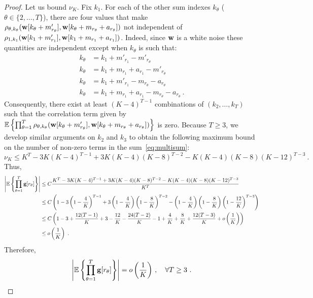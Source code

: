 \documentclass[journal,onecolumn]{IEEEtran}
\begin{document}
\begin{proof}
Let us bound $\nu_K$. Fix $k_1$. For each of the other sum indexes $k_\theta$ ($\theta\in\{2,\ldots,T\}$), there are four values that make $\rho_{\theta,k_\theta}({\mathbf w}[k_\theta+m'_{r_\theta}],{\mathbf w}[k_\theta+m_{r_\theta}+a_{r_\theta}])$ not independent of $\rho_{1,k_1}({\mathbf w}[k_1+m'_{r_1}],{\mathbf w}[k_1+m_{r_1}+a_{r_1}])$. Indeed, since ${\mathbf w}$ is a white noise these quantities are independent except when $k_\theta$ is such that:
\begin{align*}
k_\theta &= k_1+m'_{r_1}-m'_{r_\theta} \\
k_\theta &= k_1+m_{r_1}+a_{r_1} - m'_{r_\theta}\\
k_\theta &= k_1+m'_{r_1} - m_{r_\theta}- a_{r_\theta} \\
k_\theta &= k_1+m_{r_1}+a_{r_1} - m_{r_\theta}- a_{r_\theta}\ .
\end{align*}
Consequently, there exist at least $(K-4)^{T-1}$ combinations of $(k_2,\ldots,k_T)$ such that the correlation term given by ${\mathbb E}\left\{\prod_{\theta=1}^T \rho_{\theta,k_\theta}({\mathbf w}[k_\theta+m'_{r_\theta}],{\mathbf w}[k_\theta+m_{r_\theta}+a_{r_\theta}]) \right\}$ is zero. Because $T\geq 3$, we develop similar arguments on $k_2$ and $k_3$ to obtain the following maximum bound on the number of non-zero terms in the sum~\eqref{eq:multisum}:
\[
\nu_K\leq K^T - 3K(K-4)^{T-1} + 3K(K-4)(K-8)^{T-2}- K(K-4)(K-8)(K-12)^{T-3}\ .
\]
Thus,
\begin{align*}
\left|{\mathbb E}\left\{\prod_{\theta=1}^T{\mathbf g}[r_\theta]\right\}\right| &\leq C \dfrac{K^T - 3K(K-4)^{T-1} + 3K(K-4)(K-8)^{T-2}- K(K-4)(K-8)(K-12)^{T-3}}{K^T} \\
&\leq C \left( 1 - 3\left(1-\frac4K\right)^{T-1} + 3\left(1-\frac4K\right)\left(1-\frac8K\right)^{T-2}- \left(1-\frac4K\right)\left(1-\frac8K\right)\left(1-\frac{12}{K}\right)^{T-3} \right) \\
&\leq C \left( 1 - 3 +\frac{12(T-1)}{K} + 3-\frac{12}K-\frac{24(T-2)}{K} -1 + \frac{4}K + \frac{8}K +\frac{12(T-3)}{K} + o\left(\dfrac1K\right)\right) \\
&\leq o\left(\dfrac1K\right)\ . \\
\end{align*}
Therefore,
\begin{equation*}
\left|{\mathbb E}\left\{\prod_{\theta=1}^T{\mathbf g}[r_\theta]\right\}\right| = o\left(\dfrac1K\right)\,,\quad\forall T\geq 3\ .
\end{equation*}
\end{proof}
\end{document}
